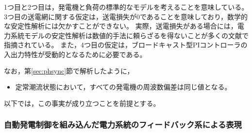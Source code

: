 \documentclass[tombow,dvipdfmx]{corona-a5-1.1}
\begin{document}
1つ目と2つ目は，発電機と負荷の標準的なモデルを考えることを意味している。
3つ目の送電網に関する仮定は，送電損失が0であることを意味しており，数学的な安定性解析には欠かすことができない。
実際，送電損失がある場合には，電力系統モデルの安定性解析は数値的手法に頼らざるを得ないことが多くの文献で指摘されている\cite{narasimhamurthi1984existence,yang2019distributed}。
また，4つ目の仮定は，ブロードキャスト型PIコントローラの入出力特性が受動的となるために必要である。

なお，第\ref{sec:phsync}節で解析したように，
\begin{itemize}
\item 定常潮流状態において，すべての発電機の周波数偏差は同じ値となる。
\end{itemize}
以下では，この事実が成り立つことを前提とする。

\subsubsection{自動発電制御を組み込んだ電力系統のフィードバック系による表現}
\end{document}
